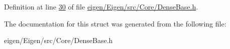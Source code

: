 Definition at line \hyperlink{eigen_2_eigen_2src_2_core_2_dense_base_8h_source_l00030}{30} of file \hyperlink{eigen_2_eigen_2src_2_core_2_dense_base_8h_source}{eigen/\+Eigen/src/\+Core/\+Dense\+Base.\+h}.



The documentation for this struct was generated from the following file\+:\begin{DoxyCompactItemize}
\item 
eigen/\+Eigen/src/\+Core/\+Dense\+Base.\+h\end{DoxyCompactItemize}
